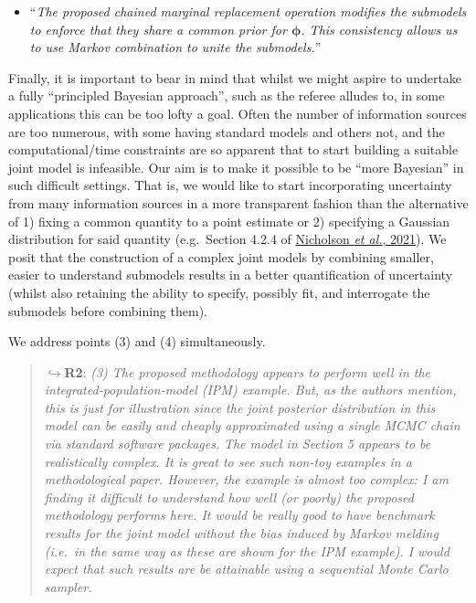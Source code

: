 \documentclass[
  10pt,
  a4paper,
]{article}
\providecommand{\tightlist}{%
  \setlength{\itemsep}{0pt}\setlength{\parskip}{0pt}}
\begin{document}
\begin{itemize}
\tightlist
\item
  ``\emph{The proposed chained marginal replacement operation modifies
  the submodels to enforce that they share a common prior for
  \(\boldsymbol{\phi}\). This consistency allows us to use Markov
  combination to unite the submodels.}''
\end{itemize}

Finally, it is important to bear in mind that whilst we might aspire to
undertake a fully ``principled Bayesian approach'', such as the referee
alludes to, in some applications this can be too lofty a goal. Often the
number of information sources are too numerous, with some having
standard models and others not, and the computational/time constraints
are so apparent that to start building a suitable joint model is
infeasible. Our aim is to make it possible to be ``more Bayesian'' in
such difficult settings. That is, we would like to start incorporating
uncertainty from many information sources in a more transparent fashion
than the alternative of 1) fixing a common quantity to a point estimate
or 2) specifying a Gaussian distribution for said quantity (e.g.~Section
4.2.4 of
\protect\hyperlink{ref-nicholson_interoperability_2021}{Nicholson
\emph{et al.}, 2021}). We posit that the construction of a complex joint
models by combining smaller, easier to understand submodels results in a
better quantification of uncertainty (whilst also retaining the ability
to specify, possibly fit, and interrogate the submodels before combining
them).

\par

\noindent\hrulefill

\par

We address points (3) and (4) simultaneously.

\begin{quote}
\(\hookrightarrow\)\textbf{R2}: \emph{(3) The proposed methodology
appears to perform well in the integrated-population-model (IPM)
example. But, as the authors mention, this is just for illustration
since the joint posterior distribution in this model can be easily and
cheaply approximated using a single MCMC chain via standard software
packages.} \emph{The model in Section 5 appears to be realistically
complex. It is great to see such non-toy examples in a methodological
paper. However, the example is almost too complex: I am finding it
difficult to understand how well (or poorly) the proposed methodology
performs here. It would be really good to have benchmark results for the
joint model without the bias induced by Markov melding (i.e.~in the same
way as these are shown for the IPM example). I would expect that such
results are be attainable using a sequential Monte Carlo sampler.}
\end{quote}
\end{document}
